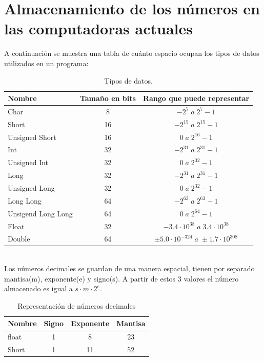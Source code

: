 \documentclass{report}
\begin{document}
\section{Almacenamiento de los n\'umeros en las computadoras actuales}
A continuaci\'on se muestra una tabla de cu\'anto espacio ocupan los tipos de datos utilizados
en un programa:

	\begin{table}[h!]
		\centering
		\begin{tabular}{|l|c|c|} \hline
			{\bf Nombre} & {\bf Tama\~no en bits} & {\bf Rango que puede representar} \\\hline
			Char  & 8 & $-2^7 \;a\;2^7 - 1$\\\hline
			Short  & 16  &$-2^{15} \;a\;2^{15} - 1$\\\hline
			Unsigned Short  & 16  &$0 \;a\;2^{16} - 1$\\\hline
			Int  & 32  &$-2^{31} \;a\;2^{31} - 1$\\\hline
			Unsigned Int  & 32  &$0 \;a\;2^{32} - 1$\\\hline
			Long  & 32 &$-2^{31} \;a\;2^{31} - 1$\\\hline
			Unsigned Long  & 32  &$0 \;a\;2^{32} - 1$\\\hline
			Long Long  & 64  &$-2^{63} \;a\;2^{63} - 1$\\\hline
			Unsigend Long Long  & 64  &$0 \;a\;2^{64} - 1$\\\hline
			Float & 32  &$−3.4 \cdot 10^{38}\; a \;3.4 \cdot 10^{38}$\\\hline
			Double & 64  &$\pm 5.0 \cdot 10^{−324} \;a\; \pm 1.7 \cdot 10^{308}$\\\hline
		\end{tabular}
		\caption{Tipos de datos.}
		\label{TiposDatos}
	\end{table}
	\hspace{1cm}\\
	Los n\'umeros decimales se guardan de una manera espacial, tienen por separado mantisa(m),
	exponente(e) y signo(s). A partir de estos 3 valores el n\'umero almacenado es igual a $s \cdot m \cdot 2^e$.
	
	\begin{table}[h!]
		\centering
		\begin{tabular}{|l|c|c|c|} \hline
			{\bf Nombre} & {\bf Signo} & {\bf Exponente} & {\bf Mantisa}\\\hline
			float  & 1 & 8 & 23\\\hline
			Short  & 1  & 11 & 52\\\hline
		\end{tabular}
		\caption{Representaci\'on de n\'umeros decimales}
		\label{Decimales}
	\end{table}
	\hspace{1cm}\\
\end{document}
